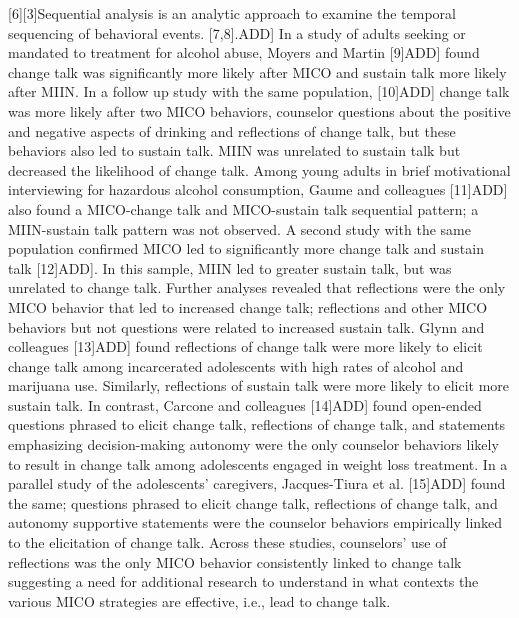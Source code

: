 [6][3]Sequential analysis is an analytic approach to examine the temporal sequencing of behavioral events. [7,8].ADD] In a study of adults seeking or mandated to treatment for alcohol abuse, Moyers and Martin [9]ADD] found change talk was significantly more likely after MICO and sustain talk more likely after MIIN. In a follow up study with the same population, [10]ADD] change talk was more likely after two MICO behaviors, counselor questions about the positive and negative aspects of drinking and reflections of change talk, but these behaviors also led to sustain talk. MIIN was unrelated to sustain talk but decreased the likelihood of change talk. Among young adults in brief motivational interviewing for hazardous alcohol consumption, Gaume and colleagues [11]ADD] also found a MICO-change talk and MICO-sustain talk sequential pattern; a MIIN-sustain talk pattern was not observed. A second study with the same population confirmed MICO led to significantly more change talk and sustain talk [12]ADD]. In this sample, MIIN led to greater sustain talk, but was unrelated to change talk. Further analyses revealed that reflections were the only MICO behavior that led to increased change talk; reflections and other MICO behaviors but not questions were related to increased sustain talk. Glynn and colleagues [13]ADD] found reflections of change talk were more likely to elicit change talk among incarcerated adolescents with high rates of alcohol and marijuana use. Similarly, reflections of sustain talk were more likely to elicit more sustain talk. In contrast, Carcone and colleagues [14]ADD] found open-ended questions phrased to elicit change talk, reflections of change talk, and statements emphasizing decision-making autonomy were the only counselor behaviors likely to result in change talk among adolescents engaged in weight loss treatment. In a parallel study of the adolescents’ caregivers, Jacques-Tiura et al. [15]ADD] found the same; questions phrased to elicit change talk, reflections of change talk, and autonomy supportive statements were the counselor behaviors empirically linked to the elicitation of change talk. Across these studies, counselors’ use of reflections was the only MICO behavior consistently linked to change talk suggesting a need for additional research to understand in what contexts the various MICO strategies are effective, i.e., lead to change talk. 

